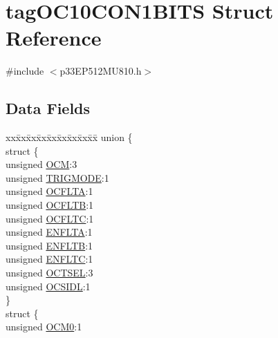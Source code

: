 \hypertarget{structtag_o_c10_c_o_n1_b_i_t_s}{}\section{tag\+O\+C10\+C\+O\+N1\+B\+I\+TS Struct Reference}
\label{structtag_o_c10_c_o_n1_b_i_t_s}


{\ttfamily \#include $<$p33\+E\+P512\+M\+U810.\+h$>$}

\subsection*{Data Fields}
\begin{DoxyCompactItemize}
\item 
\begin{tabbing}
xx\=xx\=xx\=xx\=xx\=xx\=xx\=xx\=xx\=\kill
union \{\\
\>struct \{\\
\>\>unsigned \hyperlink{structtag_o_c10_c_o_n1_b_i_t_s_a778fa0cf51a9477ac4e82d71a8733801}{OCM}:3\\
\>\>unsigned \hyperlink{structtag_o_c10_c_o_n1_b_i_t_s_a7a0057e0dca6e2663584b5b9e1da04c3}{TRIGMODE}:1\\
\>\>unsigned \hyperlink{structtag_o_c10_c_o_n1_b_i_t_s_acc967e41cecdeedc6ad4422f9ef1a6a3}{OCFLTA}:1\\
\>\>unsigned \hyperlink{structtag_o_c10_c_o_n1_b_i_t_s_a1fb30bb4421ef7c4bd0c66c379875593}{OCFLTB}:1\\
\>\>unsigned \hyperlink{structtag_o_c10_c_o_n1_b_i_t_s_a69a1772a4144abd579d17d28445b9934}{OCFLTC}:1\\
\>\>unsigned \hyperlink{structtag_o_c10_c_o_n1_b_i_t_s_a1e0f05fb23d516e003e4713fe8c1498a}{ENFLTA}:1\\
\>\>unsigned \hyperlink{structtag_o_c10_c_o_n1_b_i_t_s_a9d7aa97d5328b8b81ab7fd9145dfa0fc}{ENFLTB}:1\\
\>\>unsigned \hyperlink{structtag_o_c10_c_o_n1_b_i_t_s_a0b6f25c0f83f33b5501b6a2e6141a6ef}{ENFLTC}:1\\
\>\>unsigned \hyperlink{structtag_o_c10_c_o_n1_b_i_t_s_ae37d2a41dae2d2af1d82f7caae33cadb}{OCTSEL}:3\\
\>\>unsigned \hyperlink{structtag_o_c10_c_o_n1_b_i_t_s_afd05f4f249db4ef69b684e2f3fa6b703}{OCSIDL}:1\\
\>\} \\
\>struct \{\\
\>\>unsigned \hyperlink{structtag_o_c10_c_o_n1_b_i_t_s_a9271e84c9759ff10a7bc1cee3276e8f6}{OCM0}:1\\

\end{tabbing}
\end{DoxyCompactItemize}
